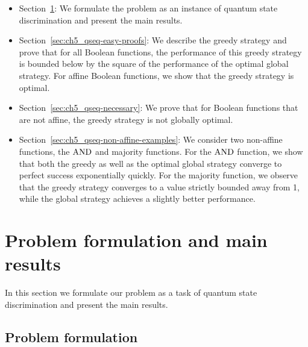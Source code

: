 \begin{itemize}
    \item Section~\ref{sec:ch5_qseq-main}: We formulate the problem as an instance of quantum state discrimination and present the main results.
    \item Section~\ref{sec:ch5_qseq-easy-proofs}: We describe the greedy strategy and prove that for all Boolean functions, the performance of this greedy strategy is bounded below by the square of the performance of the optimal global strategy.
    For affine Boolean functions, we show that the greedy strategy is optimal.
    \item Section~\ref{sec:ch5_qseq-necessary}: We prove that for Boolean functions that are not affine, the greedy strategy is not globally optimal.
    \item Section~\ref{sec:ch5_qseq-non-affine-examples}: We consider two non-affine functions, the $\mathrm{AND}$ and majority functions. For the $\mathrm{AND}$ function, we show that both the greedy as well as the optimal global strategy converge to perfect success exponentially quickly. For the majority function, we observe that the greedy strategy converges to a value strictly bounded away from 1, while the global strategy achieves a slightly better performance.
\end{itemize}

\section{Problem formulation and main results}\label{sec:ch5_qseq-main}

In this section we formulate our problem as a task of quantum state discrimination and present the main results.


\subsection{Problem formulation}

